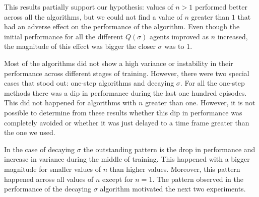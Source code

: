 This results partially support our hypothesis: values of $n > 1$ performed better across all the algorithms, but we could not find a value of $n$ greater than $1$ that had an adverse effect on the performance of the algorithm.
Even though the initial performance for all the different $Q(\sigma)$ agents improved as $n$ increased, the magnitude of this effect was bigger the closer $\sigma$ was to $1$.


Most of the algorithms did not show a high variance or instability in their performance across different stages of training.
However, there were two special cases that stood out: one-step algorithms and decaying $\sigma$.
For all the one-step methods there was a dip in performance during the last one hundred episodes.
This did not happened for algorithms with $n$ greater than one.
However, it is not possible to determine from these results whether this dip in performance was completely avoided or whether it was just delayed to a time frame greater than the one we used.

In the case of decaying $\sigma$ the outstanding pattern is the drop in performance and increase in variance during the middle of training.
This happened with a bigger magnitude for smaller values of $n$ than higher values.
Moreover, this pattern happened across all values of $n$ except for $n=1$.
The pattern observed in the performance of the decaying $\sigma$ algorithm motivated the next two experiments.

